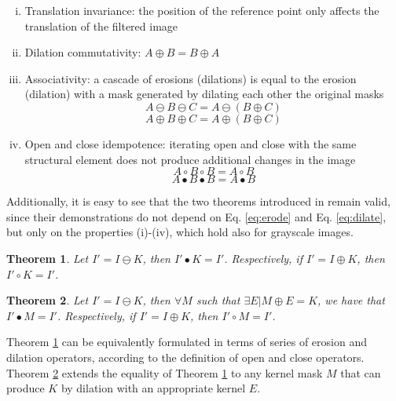 \documentclass[review]{elsarticle}
\newtheorem{theorem}{Theorem}
\begin{document}
\begin{enumerate}[(i)]
	\item Translation invariance: the position of the reference point only affects the translation of the filtered image
	\item Dilation commutativity: $A\oplus B = B \oplus A$
	\item Associativity: a cascade of erosions (dilations) is equal to the erosion (dilation) with a mask generated by dilating each other the original masks
	\begin{equation}
	A \ominus B \ominus C = A \ominus (B \oplus C)
	\end{equation}
	\begin{equation}
	A \oplus B \oplus C = A \oplus (B \oplus C)
	\end{equation} 
	\item Open and close idempotence: iterating open and close with the same structural element does not produce additional changes in the image
	\begin{equation}
	A \circ B \circ B = A \circ B
	\end{equation}
	\begin{equation}
	A \bullet B \bullet B = A \bullet B
	\end{equation} 
\end{enumerate}

Additionally, it is easy to see that the two theorems introduced in \cite{de2017detecting} remain valid, since their demonstrations do not depend on Eq. \ref{eq:erode} and Eq. \ref{eq:dilate}, but only on the properties (i)-(iv), which hold also for grayscale images.

\begin{theorem}
	\label{theorem_1}
	Let $I' = I \ominus K$, then $I'\bullet K = I'$. Respectively, if $I' = I \oplus K$, then $I'\circ K = I'$.
\end{theorem}

\begin{theorem}
	\label{theorem_2}
	Let $I' = I \ominus K$, then $\forall M$ such that $\exists E | M \oplus E = K$, we have that $I' \bullet M = I'$. Respectively, if $I' = I \oplus K$, then $I' \circ M = I'$.
\end{theorem}

Theorem \ref{theorem_1} can be equivalently formulated in terms of series of erosion and dilation operators, according to the definition of open and close operators. Theorem \ref{theorem_2} extends the equality of Theorem \ref{theorem_1} to any kernel mask $M$ that can produce $K$ by dilation with an appropriate kernel $E$.
\end{document}
